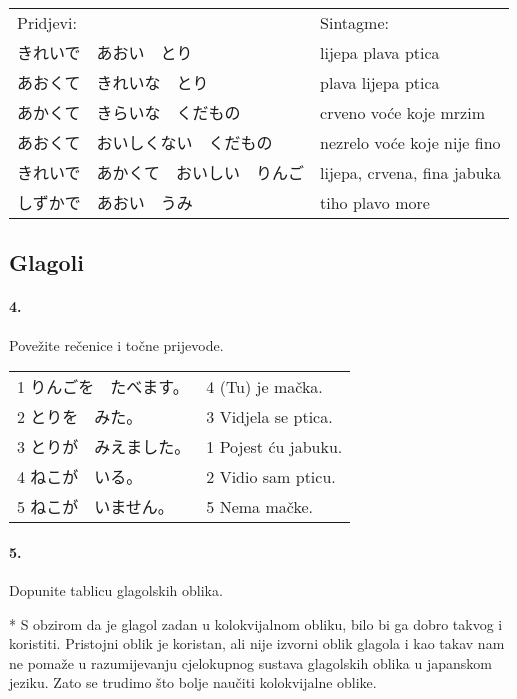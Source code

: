 \documentclass[12pt]{article}
\begin{document}
	\begin{tabularx}{\textwidth}{X X}
		Pridjevi:&Sintagme:\\
		きれいで　あおい　とり&lijepa plava ptica\\
		あおくて　きれいな　とり&plava lijepa ptica\\
		あかくて　きらいな　くだもの&crveno voće koje mrzim\\
		あおくて　おいしくない　くだもの&nezrelo voće koje nije fino\\
		きれいで　あかくて　おいしい　りんご&lijepa, crvena, fina jabuka\\
		しずかで　あおい　うみ&tiho plavo more\\
	\end{tabularx}

	\subsection{Glagoli}
	
	\paragraph{4.} Povežite rečenice i točne prijevode.
	
	\begin{tabularx}{\textwidth}{X X}
		1 りんごを　たべます。&4 (Tu) je mačka.\\
		2 とりを　みた。&3 Vidjela se ptica.\\
		3 とりが　みえました。&1 Pojest ću jabuku.\\
		4 ねこが　いる。&2 Vidio sam pticu.\\
		5 ねこが　いません。&5 Nema mačke.\\
	\end{tabularx}
	
	\newpage
	\paragraph{5.} Dopunite tablicu glagolskih oblika.
	
	* S obzirom da je glagol zadan u kolokvijalnom obliku, bilo bi ga dobro takvog i koristiti. Pristojni oblik je koristan, ali nije izvorni oblik glagola i kao takav nam ne pomaže u razumijevanju cjelokupnog sustava glagolskih oblika u japanskom jeziku. Zato se trudimo što bolje naučiti kolokvijalne oblike.
	
\end{document}
